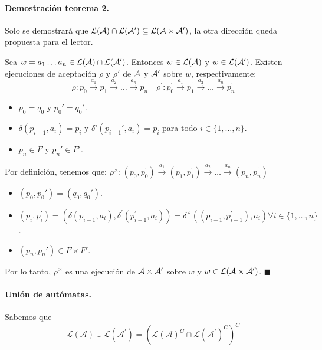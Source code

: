 
\paragraph{Demostración teorema 2.} Solo se demostrará que $\mathcal{L}(\mathcal{A}) \cap \mathcal{L}(\mathcal{A}') \subseteq \mathcal{L}(\mathcal{A} \times \mathcal{A}')$, la otra dirección queda propuesta para el lector. \medbreak

Sea $w = a_1 \ldots a_n \in \mathcal{L}(\mathcal{A}) \cap \mathcal{L}(\mathcal{A}')$. Entonces $w \in \mathcal{L}(\mathcal{A})$ y $w \in \mathcal{L}(\mathcal{A}')$. Existen ejecuciones de aceptación $\rho$ y $\rho'$ de $\mathcal{A}$ y $\mathcal{A}'$ sobre $w$, respectivamente:
$$
    \rho: p_0 \stackrel{a_1}{\rightarrow} p_1 \stackrel{a_2}{\rightarrow} \ldots \stackrel{a_n}{\rightarrow} p_n \quad \rho^{\prime}: p_0^{\prime} \stackrel{a_1}{\rightarrow} p_1^{\prime} \stackrel{a_2}{\rightarrow} \ldots \stackrel{a_n}{\rightarrow} p_n^{\prime}
$$
\begin{itemize}
    \item $p_0 = q_0$ y $p_0' = q_0'$.
    \item $\delta(p_{i-1},a_i) = p_i$ y $\delta'(p_{i-1}',a_i) = p_i$ para todo $i \in \{1,\ldots, n\}$.
    \item $p_n \in F$ y $p_n' \in F'$.
\end{itemize}

Por definición, tenemos que: $\rho^{\times}:\left(p_0, p_0^{\prime}\right) \stackrel{a_1}{\rightarrow}\left(p_1, p_1^{\prime}\right) \stackrel{a_2}{\rightarrow} \ldots \stackrel{a_n}{\rightarrow}\left(p_n, p_n^{\prime}\right)$
\begin{itemize}
    \item $(p_0,p_0') = (q_0,q_0')$.
    \item $\left(p_i, p_i^{\prime}\right)=\left(\delta\left(p_{i-1}, a_i\right), \delta^{\prime}\left(p_{i-1}^{\prime}, a_i\right)\right)=\delta^{\times}\left(\left(p_{i-1}, p_{i-1}^{\prime}\right), a_i\right) \forall i \in\{1, \ldots, n\}$.
    \item $(p_n,p_n') \in F \times F'$.
\end{itemize}

Por lo tanto, $\rho^\times$ es una ejecución de $\mathcal{A} \times \mathcal{A}'$ sobre $w$ y $w \in \mathcal{L}(\mathcal{A} \times \mathcal{A}')$. \hfill $\blacksquare$

\paragraph{Unión de autómatas.} Sabemos que
$$
    \mathcal{L}(\mathcal{A}) \cup \mathcal{L}\left(\mathcal{A}^{\prime}\right)=\left(\mathcal{L}(\mathcal{A})^C \cap \mathcal{L}\left(\mathcal{A}^{\prime}\right)^C\right)^C
$$

